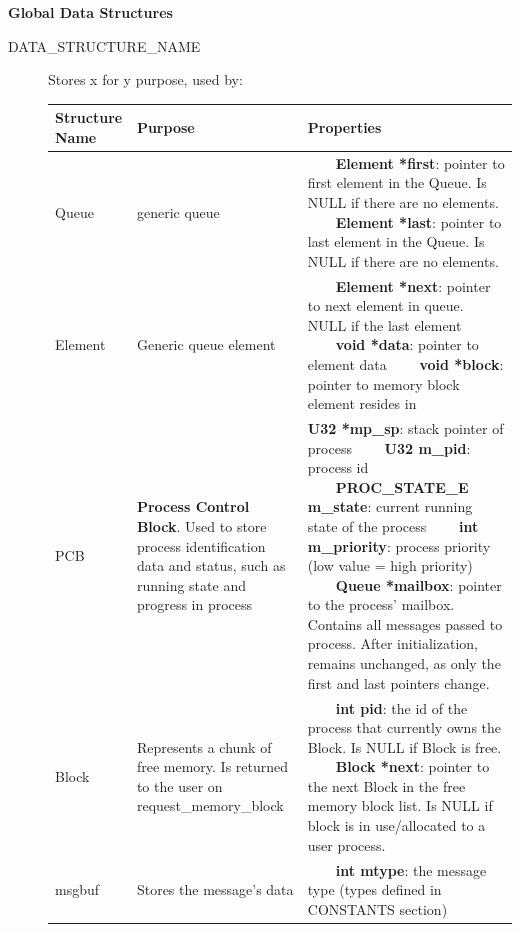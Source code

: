 \documentclass[11pt, oneside]{article}
\newcommand{\tabitem}{~~\llap{\textbullet}~~}
\begin{document}
{\bf Global Data Structures}
\begin{description}
\item [DATA\_STRUCTURE\_NAME] Stores x for y purpose, used by:
\newline
\begin{longtable}{|L{2cm}|L{5cm}|L{8cm}|} \hline
\textbf{Structure Name} & \textbf{Purpose} & \textbf{Properties} \\ \hline
Queue& generic queue &
\tabitem \textbf{Element *first}: pointer to first element in the Queue. Is NULL if there are no elements.
\newline
\tabitem \textbf{Element *last}: pointer to last element in the Queue. Is NULL if there are no elements.\\ \hline
Element & Generic queue element &
\tabitem \textbf{Element *next}: pointer to next element in queue. NULL if the last element
\newline
\tabitem \textbf{void *data}: pointer to element data
\newline
\tabitem \textbf{void *block}: pointer to memory block element resides in \\ \hline
PCB & \textbf{Process Control Block}. Used to store process identification data and status, such as running state and progress in process& \textbf{U32 *mp\_sp}: stack pointer of process \newline
\tabitem \textbf{U32 m\_pid}: process id \newline
\tabitem \textbf{PROC\_STATE\_E m\_state}: current running state of the process \newline
\tabitem \textbf{int m\_priority}: process priority (low value = high priority) \newline
\tabitem \textbf{Queue *mailbox}: pointer to the process' mailbox. Contains all messages passed to process. After initialization, remains unchanged, as only the first and last pointers change.\\ \hline
Block & Represents a chunk of free memory. Is returned to the user on request\_memory\_block &
\tabitem \textbf{int pid}: the id of the process that currently owns the Block. Is NULL if Block is free. \newline
\tabitem \textbf{Block *next}: pointer to the next Block in the free memory block list. Is NULL if block is in use/allocated to a user process. \\ \hline
msgbuf&Stores the message's data&
\tabitem \textbf{int mtype}: the message type (types defined in CONSTANTS section) \newline

\end{longtable}
\end{description}
\end{document}
